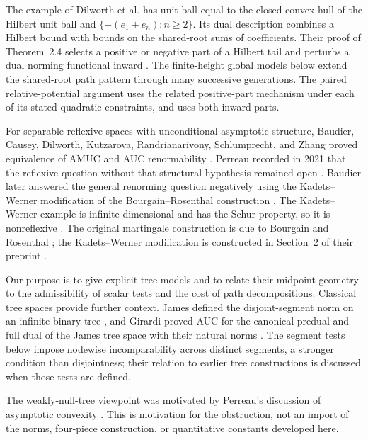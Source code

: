 The example of Dilworth et al. has unit ball equal to the closed convex
hull of the Hilbert unit ball and $\{\pm(e_1+e_n):n\ge2\}$. Its dual description combines a Hilbert bound
with bounds on the shared-root sums of coefficients. Their proof of
Theorem~2.4 selects a positive or negative part of a Hilbert tail and
perturbs a dual norming functional inward
\cite[Lemma~2.5 and proof of Theorem~2.4]{DKRRZ2016}. The finite-height
global models below extend the shared-root path pattern through many
successive generations. The paired relative-potential argument uses the
related positive-part mechanism under each of its stated quadratic
constraints, and uses both inward parts.

For separable reflexive spaces with unconditional asymptotic structure,
Baudier, Causey, Dilworth, Kutzarova, Randrianarivony, Schlumprecht, and
Zhang proved equivalence of AMUC and AUC renormability
\cite[Corollary~5.4]{BaudierEtAl2017}. Perreau recorded in 2021 that
the reflexive question without that structural hypothesis remained open
\cite[Introduction, after Theorem~C]{Perreau2021}. Baudier later answered
the general renorming question negatively using the Kadets--Werner
modification of the Bourgain--Rosenthal construction
\cite[Theorem~1 and Corollary~1]{Baudier2026}. The Kadets--Werner example
is infinite dimensional and has the Schur property, so it is nonreflexive
\cite[Theorem~2.5 and the paragraph before Corollary~2.6]{KW2004}.
The original martingale construction is due to Bourgain and Rosenthal \cite{BR1980}; the
Kadets--Werner modification is constructed in Section~2 of their
preprint \cite{KW2004}.

Our purpose is to give explicit tree models and to relate their midpoint
geometry to the admissibility of scalar tests and the cost of path
decompositions. Classical tree spaces provide further context. James
defined the disjoint-segment norm on an infinite binary tree \cite[p.~739]{James1974},
and Girardi proved AUC for the canonical predual and full dual of the
James tree space with their natural norms
\cite[Theorems~3 and~5]{Girardi2001}. The segment tests below impose
nodewise incomparability across distinct segments, a stronger condition
than disjointness; their relation to earlier tree constructions is
discussed when those tests are defined.

The weakly-null-tree viewpoint was motivated by Perreau's discussion of
asymptotic convexity \cite[\S3.3]{Perreau2021}.
This is motivation for the obstruction, not an import of the norms,
four-piece construction, or quantitative constants developed here.


